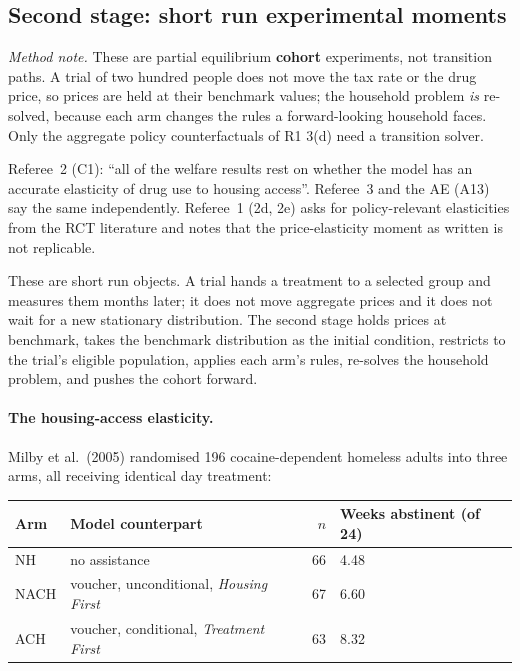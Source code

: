 \documentclass[11pt]{article}
\begin{document}
\subsection{Second stage: short run experimental moments}
\label{sec:secondstage}

\emph{Method note.} These are partial equilibrium \textbf{cohort}
experiments, not transition paths. A trial of two hundred people does not move
the tax rate or the drug price, so prices are held at their benchmark values; the
household problem \emph{is} re-solved, because each arm changes the rules a
forward-looking household faces. Only the aggregate policy counterfactuals of
R1 3(d) need a transition solver.

Referee~2 (C1): ``all of the welfare results rest on whether the model has an
accurate elasticity of drug use to housing access''. Referee~3 and the AE (A13)
say the same independently. Referee~1 (2d, 2e) asks for policy-relevant
elasticities from the RCT literature and notes that the price-elasticity moment
as written is not replicable.

These are short run objects. A trial hands a treatment to a selected group and
measures them months later; it does not move aggregate prices and it does not
wait for a new stationary distribution. The second stage holds prices at
benchmark, takes the benchmark distribution as the initial condition, restricts
to the trial's eligible population, applies each arm's rules, re-solves the
household problem, and pushes the cohort forward.

\paragraph{The housing-access elasticity.} Milby et al.\ (2005) randomised 196
cocaine-dependent homeless adults into three arms, all receiving identical day
treatment:

\begin{center}
\begin{tabular}{llrl}
\toprule
Arm & Model counterpart & $n$ & Weeks abstinent (of 24)\\
\midrule
NH   & no assistance & 66 & 4.48\\
NACH & voucher, unconditional, \emph{Housing First} & 67 & 6.60\\
ACH  & voucher, conditional, \emph{Treatment First} & 63 & 8.32\\
\bottomrule
\end{tabular}
\end{center}
\end{document}
